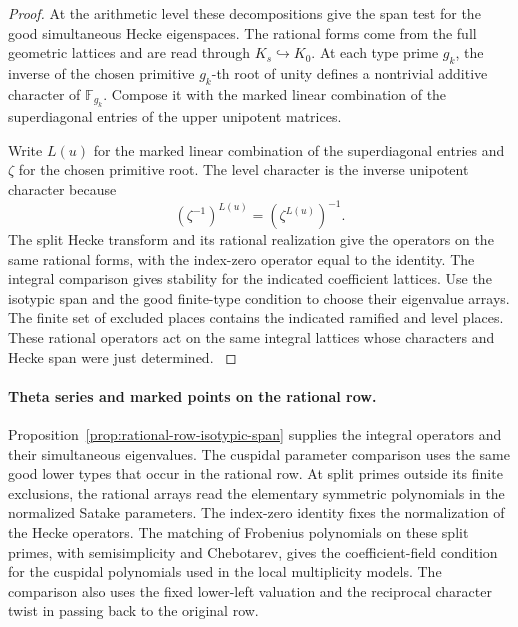 \begin{proof}
At the arithmetic level these decompositions give the
span test for the good simultaneous Hecke eigenspaces.
The rational forms come from the full geometric lattices
and are read through \(K_s\hookrightarrow K_0\).
At each type prime \(g_k\), the inverse of the
chosen primitive \(g_k\)-th root of unity defines
a nontrivial additive character of \(\mathbb F_{g_k}\).
Compose it with the marked linear combination of the
superdiagonal entries of the upper unipotent matrices.

Write \(L(u)\) for the marked linear combination of the superdiagonal entries and \(\zeta\) for the chosen primitive root. The level character is the inverse unipotent character because
\[
 (\zeta^{-1})^{L(u)}=(\zeta^{L(u)})^{-1}.
\] The split
Hecke transform and its rational realization give the operators
on the same rational forms, with the index-zero operator
equal to the identity. The integral comparison gives
stability for the indicated coefficient lattices.
Use the isotypic span and the good finite-type condition
to choose their eigenvalue arrays. The finite set of
excluded places contains the indicated ramified and level
places. These rational operators act on the same integral lattices
whose characters and Hecke span were just determined. \label{cor:automorphic-realization-26}
\end{proof}

\paragraph{Theta series and marked points on the rational row.}
Proposition~\ref{prop:rational-row-isotypic-span} supplies the
integral operators and their simultaneous eigenvalues.
The cuspidal parameter comparison uses the same good lower
types that occur in the rational row. At split primes outside
its finite exclusions, the rational arrays read the elementary
symmetric polynomials in the normalized Satake parameters.
The index-zero identity fixes the normalization of the
Hecke operators. The matching of Frobenius polynomials on
these split primes, with semisimplicity and Chebotarev, gives
the coefficient-field condition for the cuspidal polynomials
used in the local multiplicity models. The comparison also
uses the fixed lower-left valuation and the reciprocal
character twist in passing back to the original row.
\label{cor:automorphic-realization-27}


